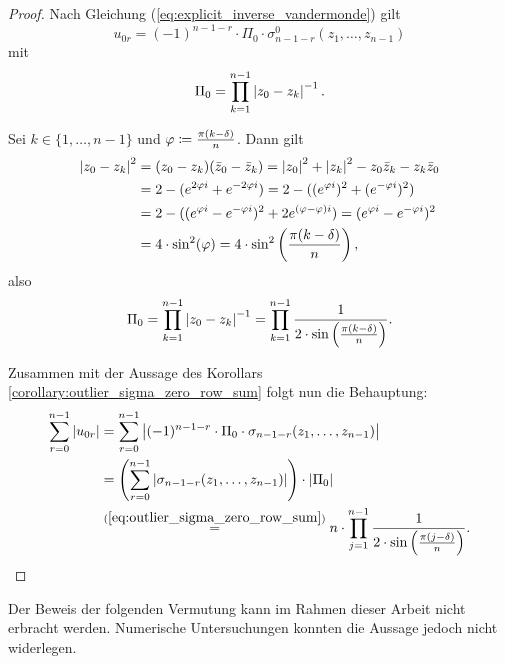 \begin{proof}
    Nach Gleichung (\ref{eq:explicit_inverse_vandermonde}) gilt
    \[
        u_{0r} = (-1)^{n-1-r} \cdot \Pi_0 \cdot \sigma_{n-1-r}^{0}(z_1, \dots, z_{n-1})
    \]
    mit
    \[
        \Pi_0 = \prod_{k=1}^{n-1} \left\lvert  z_0 - z_k  \right\rvert^{-1}.
    \]

    \noindent Sei $k \in \{1, \dots, n-1\}$ und $\varphi \coloneqq \frac{\pi (k - \delta)}{n}$.
    Dann gilt
    \[
        \begin{split}
            \left\lvert z_0 - z_k \right\rvert^2
            &= (z_0 - z_k) (\bar{z}_0 - \bar{z}_k)
            = \left\lvert z_0 \right\rvert^2 + \left\lvert z_k \right\rvert^2 - z_0\bar{z}_k - z_k\bar{z}_0\\
            &= 2 - (e^{2 \varphi i} + e^{-2 \varphi i})
            = 2 - ((e^{\varphi i})^2 + (e^{-\varphi i})^2)\\
            &= 2 - ( (e^{\varphi i} - e^{-\varphi i})^2 + 2 e^{(\varphi - \varphi) i})
            = (e^{\varphi i} - e^{-\varphi i})^2\\
            &= 4 \cdot \sin^2 (\varphi)
            = 4 \cdot \sin^2 \left( \frac{\pi (k-\delta)}{n} \right),
        \end{split}
    \]
    also
    \begin{equation}
        \label{eq:pi_0}
        \Pi_0
        = \prod_{\substack{k = 1}}^{n-1} \left\lvert  z_0 - z_k  \right\rvert^{-1}
        = \prod_{\substack{k = 1}}^{n-1} \frac{1}{2 \cdot \sin \left( \frac{\pi (k-\delta)}{n} \right)}.
    \end{equation}

    \noindent Zusammen mit der Aussage des Korollars
    \ref{corollary:outlier_sigma_zero_row_sum} folgt nun die Behauptung:
    \[
        \begin{split}
            \sum_{r=0}^{n-1} \left\lvert  u_{0r}  \right\rvert
            &= \sum_{r=0}^{n-1} \left\lvert  (-1)^{n-1-r} \cdot \Pi_0 \cdot \sigma_{n-1-r}(z_1, \dots, z_{n-1})  \right\rvert\\
            &= \left( \sum_{r=0}^{n-1} \left\lvert  \sigma_{n-1-r}(z_1, \dots, z_{n-1})  \right\rvert \right) \cdot \left\lvert \Pi_0 \right\rvert\\
            &\overset{(\ref{eq:outlier_sigma_zero_row_sum})}{=}
                n \cdot \prod_{j=1}^{n-1} \frac{1}{2 \cdot \sin \left(\frac{\pi (j - \delta)}{n} \right)}.
        \end{split}
    \]
\end{proof}

\noindent Der Beweis der folgenden Vermutung kann im Rahmen dieser Arbeit nicht
erbracht werden. Numerische Untersuchungen konnten die Aussage jedoch nicht
widerlegen.

